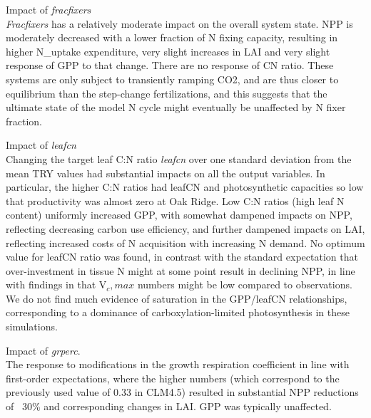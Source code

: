 \documentclass[draft,linenumbers]{agujournal}
\begin{document}
Impact of \emph{fracfixers}\\
\emph{Fracfixers} has a relatively moderate impact on the overall system state. NPP is moderately decreased with a lower fraction of N fixing capacity, resulting in higher N\_uptake expenditure, very slight increases in LAI and very slight response of GPP to that change. There are no response of CN ratio. These systems are only subject to transiently ramping CO2, and are thus closer to equilibrium than the step-change fertilizations, and this suggests that the ultimate state of the model N cycle might eventually be unaffected by N fixer fraction.

Impact of \emph{leafcn}\\
Changing the target leaf C:N ratio \emph{leafcn} over one standard deviation from the mean TRY values had substantial impacts on all the output variables. In particular, the higher C:N ratios had leafCN and photosynthetic capacities so low that productivity was almost zero at Oak Ridge. Low C:N ratios (high leaf N content) uniformly increased GPP, with somewhat dampened impacts on NPP, reflecting decreasing carbon use efficiency, and further dampened impacts on LAI, reflecting increased costs of N acquisition with increasing N demand.  No optimum value for leafCN ratio was found, in contrast with the standard expectation that over-investment in tissue N might at some point result in declining NPP, in line with findings in \cite{lawrence} that V${_c,max}$ numbers might be low compared to observations. We do not find much evidence of saturation in the GPP/leafCN relationships, corresponding to a dominance of carboxylation-limited photosynthesis in these simulations.

Impact of \emph{grperc}.\\
The response to modifications in the growth respiration coefficient in line with first-order expectations, where the higher numbers (which correspond to the previously used value of 0.33 in CLM4.5) resulted in substantial NPP reductions of ~30\% and corresponding changes in LAI. GPP was typically unaffected.
\end{document}
